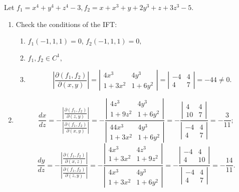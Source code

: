 \documentclass[12pt]{article} %
\theoremstyle{definition} %
\begin{document}
\begin{enumerate}
Let $f_1 = x^4+y^4+z^4-3, f_2=x+x^3+y+2y^3+z+3z^3-5.$
\begin{enumerate}
\item Check the conditions of the IFT:
\begin{enumerate}
\item $f_1(-1,1,1) =0$, $f_2(-1,1,1)=0,$
\item $f_1, f_2 \in C^1,$
\item \begin{equation*}
\left|\frac {\partial(f_1,f_2)}{\partial(x,y)}\right|=\left|
\begin{array}{cc}
4x^3 & 4y^3 \\
1+3x^2 & 1+6y^2
\end{array}
\right|=\left|
\begin{array}{cc}
-4 & 4 \\
4 & 7
\end{array}
\right| = -44 \neq 0.
\end{equation*}
\end{enumerate}
\item
\begin{equation*}
\frac{d x}{d z} = -\frac{\left|\frac {\partial(f_1,f_2)}{\partial(z,y)}\right|}{\left|\frac {\partial(f_1,f_2)}{\partial(x,y)}\right|} = -\frac{
\left|
\begin{array}{cc}
4z^3 & 4y^3 \\
1+9z^2 & 1+6y^2
\end{array}
\right|
} {
\left|
\begin{array}{cc}
44x^3 & 4y^3 \\
1+3x^2 & 1+6y^2
\end{array}
\right|} = -\frac{
\left|
\begin{array}{cc}
4 & 4 \\
10 & 7
\end{array}
\right|
}{
\left|
\begin{array}{cc}
-4 & 4 \\
4 & 7
\end{array}
\right|
} = -\frac {3} {11};
\end{equation*}
\begin{equation*}
\frac{d y}{d z} = -\frac{\left|\frac {\partial(f_1,f_2)}{\partial(x,z)}\right|}{\left|\frac {\partial(f_1,f_2)}{\partial(z,y)}\right|} = -\frac{
\left|
\begin{array}{cc}
4x^3 & 4z^3 \\
1+3x^2 & 1+9z^2
\end{array}
\right|
} {
\left|
\begin{array}{cc}
4x^3 & 4y^3 \\
1+3x^2 & 1+6y^2
\end{array}
\right|} = -\frac{
\left|
\begin{array}{cc}
-4 & 	4 \\
4 & 10
\end{array}
\right|
}{
\left|
\begin{array}{cc}
-4 & 4 \\
4 & 7
\end{array}
\right|
} = -\frac {14} {11}.
\end{equation*}
\end{enumerate}



\end{enumerate}
\end{document}
